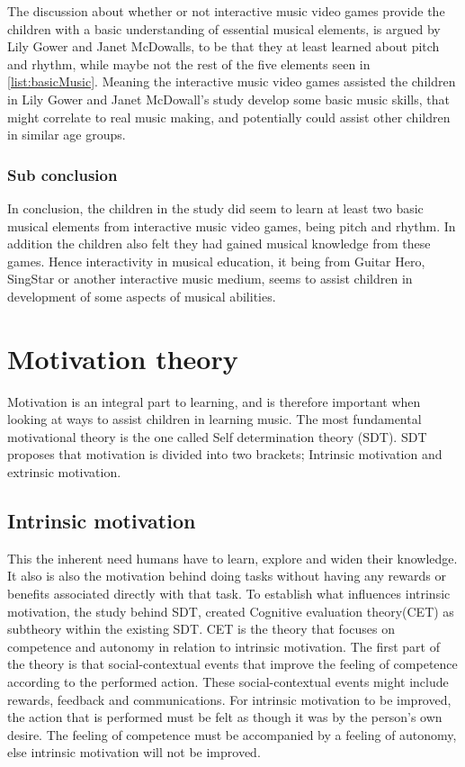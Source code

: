 The discussion about whether or not interactive music video games provide the children with a basic understanding of essential musical elements, is argued by Lily Gower and Janet McDowalls, to be that they at least learned about pitch and rhythm, while maybe not the rest of the five elements seen in \autoref{list:basicMusic}. Meaning the interactive music video games assisted the children in Lily Gower and Janet McDowall's study develop some basic music skills, that might correlate to real music making\cite[p.~99]{interactiveMusicVideoGames}, and potentially could assist other children in similar age groups.

\subsubsection*{Sub conclusion}
In conclusion, the children in the study\cite{interactiveMusicVideoGames} did seem to learn at least two basic musical elements from interactive music video games, being pitch and rhythm. In addition the children also felt they had gained musical knowledge from these games. Hence interactivity in musical education, it being from Guitar Hero, SingStar or another interactive music medium, seems to assist children in development of some aspects of musical abilities.

\section{Motivation theory}
Motivation is an integral part to learning\cite{motivationGameDesign}, and is therefore important when looking at ways to assist children in learning music. The most fundamental motivational theory is the one called Self determination theory (SDT)\cite{SDT}. SDT proposes that motivation is divided into two brackets; Intrinsic motivation and extrinsic motivation\cite{SDT}. 

\subsection*{Intrinsic motivation} 
	This the inherent need humans have to learn, explore and widen their knowledge\cite{SDT}. It also is also the motivation behind doing tasks without having any rewards or benefits associated directly with that task\cite{SDT}. To establish what influences intrinsic motivation, the study behind SDT\cite{SDT}, created Cognitive evaluation theory(CET) as subtheory within the existing SDT. CET is the theory that focuses on competence and autonomy in relation to intrinsic motivation. The first part of the theory is that social-contextual events that improve the feeling of competence according to the performed action\cite[p.~70]{SDT}. These social-contextual events might include rewards, feedback and communications\cite[p.~70]{SDT}. For intrinsic motivation to be improved, the action that is performed must be felt as though it was by the person's own desire. The feeling of competence must be accompanied by a feeling of autonomy, else intrinsic motivation will not be improved\cite[p.~70]{SDT}.\\


